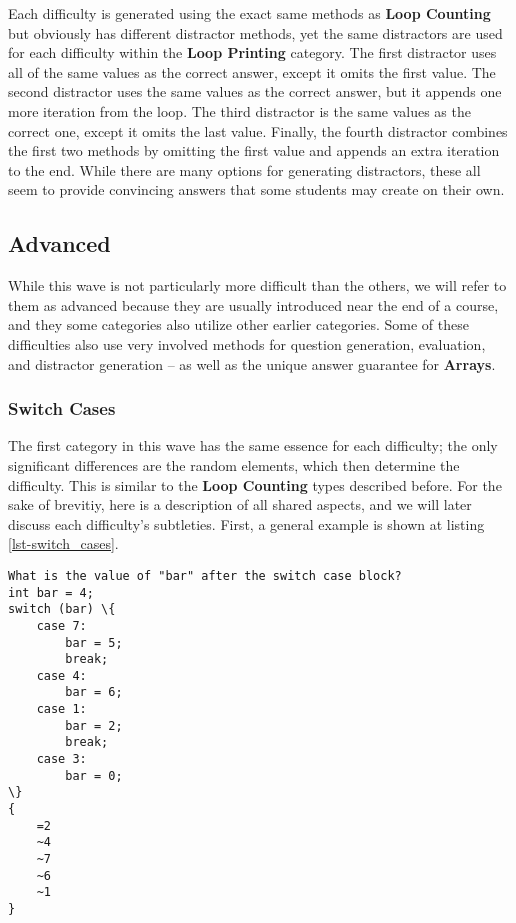 \documentclass{article}
\begin{document}
Each difficulty is generated using the exact same methods as \textbf{Loop Counting} but obviously has different distractor methods, yet the same distractors are used for each difficulty within the \textbf{Loop Printing} category. The first 
distractor uses all of the same values as the correct answer, except it omits the first value. The second distractor uses the same values as the correct answer, but it appends one more iteration
from the loop. The third distractor is the same values as the correct one, except it omits the last value. Finally, the fourth distractor combines the first two methods by omitting the first value
and appends an extra iteration to the end. While there are many options for generating distractors, these all seem to provide convincing answers that some students may create on their own.

\subsection{Advanced} \label{subsec-advanced}

While this wave is not particularly more difficult than the others, we will refer to them as advanced because they are usually introduced near the end of a course, and they some categories also 
utilize other earlier categories. Some of these difficulties also use very involved methods for question generation, evaluation, and distractor generation -- as well as the unique answer guarantee 
for \textbf{Arrays}. 

\subsubsection{Switch Cases} \label{subsubsec-switch_cases}
The first category in this wave has the same essence for each difficulty; the only significant differences are the random elements, which then determine the difficulty. This is similar to the \textbf{Loop 
Counting} types described before. For the sake of brevitiy, here is a description of all shared aspects, and we will later discuss each difficulty's subtleties. First, a general example is shown at listing \ref{lst-switch_cases}.

\begin{lstlisting}[caption={\textbf{Switch Cases} GIFT Example}, label=lst-switch_cases]
What is the value of "bar" after the switch case block?
int bar = 4; 
switch (bar) \{ 
	case 7: 
		bar = 5; 
		break; 
	case 4: 
		bar = 6; 
	case 1: 
		bar = 2;
		break; 
	case 3: 
		bar = 0; 
\}
{
	=2
	~4
	~7
	~6
	~1
} 
\end{lstlisting}
\end{document}
